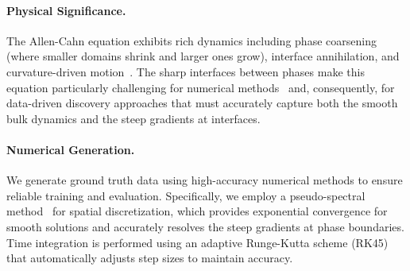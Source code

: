 \documentclass[twoside,11pt]{article}
\let\cite\citep
\newcommand{\1}{{\bf 1}}
\newcommand{\0}{{\bf 0}}
\begin{document}
\paragraph{Physical Significance.}
The Allen-Cahn equation exhibits rich dynamics including phase coarsening (where smaller domains shrink and larger ones grow), interface annihilation, and curvature-driven motion~\cite{bates1997spectral}. The sharp interfaces between phases make this equation particularly challenging for numerical methods~\cite{du2019maximum} and, consequently, for data-driven discovery approaches that must accurately capture both the smooth bulk dynamics and the steep gradients at interfaces.

\paragraph{Numerical Generation.}
We generate ground truth data using high-accuracy numerical methods to ensure reliable training and evaluation. Specifically, we employ a pseudo-spectral method~\cite{trefethen2000spectral,boyd2001chebyshev} for spatial discretization, which provides exponential convergence for smooth solutions and accurately resolves the steep gradients at phase boundaries. Time integration is performed using an adaptive Runge-Kutta scheme (RK45)~\cite{dormand1980family} that automatically adjusts step sizes to maintain accuracy.
\end{document}
